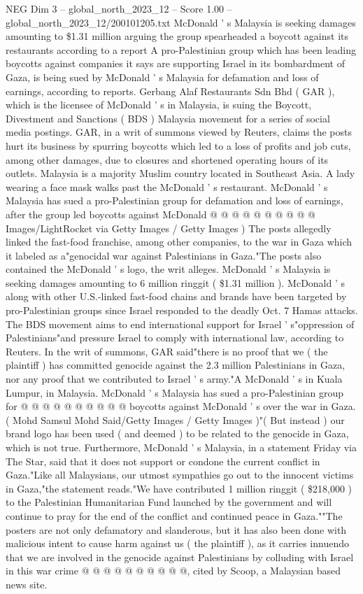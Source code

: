 \begin{textsample}{NEG Dim 3 – global\_north\_2023\_12 – Score 1.00 – global\_north\_2023\_12/200101205.txt}  \label{ex:f3_neg_194}
McDonald ' s Malaysia is seeking damages amounting to \$1.31 million arguing the group spearheaded a boycott against its restaurants according to a report A pro-Palestinian group which has been leading boycotts against companies it says are supporting Israel in its bombardment of Gaza, is being sued by McDonald ' s Malaysia for defamation and loss of earnings, according to reports.
Gerbang Alaf Restaurants Sdn Bhd ( GAR ), which is the licensee of McDonald ' s in Malaysia, is suing the Boycott, Divestment and Sanctions ( BDS ) Malaysia movement for a series of social media postings.
GAR, in a writ of summons viewed by Reuters, claims the posts hurt its business by spurring boycotts which led to a loss of profits and job cuts, among other damages, due to closures and shortened operating hours of its outlets.
Malaysia is a majority Muslim country located in Southeast Asia.
A lady wearing a face mask walks past the McDonald ' s restaurant.
McDonald ' s Malaysia has sued a pro-Palestinian group for defamation and loss of earnings, after the group led boycotts against McDonald @ @ @ @ @ @ @ @ @ @ Images/LightRocket via Getty Images / Getty Images ) The posts allegedly linked the fast-food franchise, among other companies, to the war in Gaza which it labeled as a"genocidal war against Palestinians in Gaza."The posts also contained the McDonald ' s logo, the writ alleges.
McDonald ' s Malaysia is seeking damages amounting to 6 million ringgit ( \$1.31 million ).
McDonald ' s along with other U.S.-linked fast-food chains and brands have been targeted by pro-Palestinian groups since Israel responded to the deadly Oct. 7 Hamas attacks.
The BDS movement aims to end international support for Israel ' s"oppression of Palestinians"and pressure Israel to comply with international law, according to Reuters.
In the writ of summons, GAR said"there is no proof that we ( the plaintiff ) has committed genocide against the 2.3 million Palestinians in Gaza, nor any proof that we contributed to Israel ' s army."A McDonald ' s in Kuala Lumpur, in Malaysia.
McDonald ' s Malaysia has sued a pro-Palestinian group for @ @ @ @ @ @ @ @ @ @ boycotts against McDonald ' s over the war in Gaza. ( Mohd Samsul Mohd Said/Getty Images / Getty Images )"( But instead ) our brand logo has been used ( and deemed ) to be related to the genocide in Gaza, which is not true.
Furthermore, McDonald ' s Malaysia, in a statement Friday via The Star, said that it does not support or condone the current conflict in Gaza."Like all Malaysians, our utmost sympathies go out to the innocent victims in Gaza,"the statement reads."We have contributed 1 million ringgit ( \$218,000 ) to the Palestinian Humanitarian Fund launched by the government and will continue to pray for the end of the conflict and continued peace in Gaza.""The posters are not only defamatory and slanderous, but it has also been done with malicious intent to cause harm against us ( the plaintiff ), as it carries innuendo that we are involved in the genocide against Palestinians by colluding with Israel in this war crime @ @ @ @ @ @ @ @ @ @, cited by Scoop, a Malaysian based news site.

\end{textsample}

